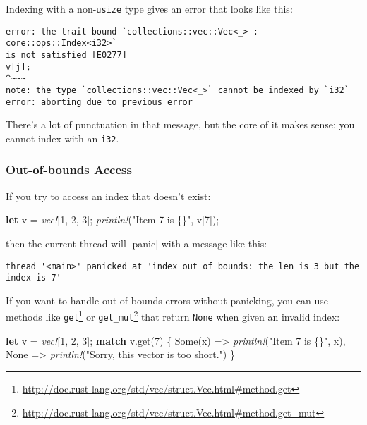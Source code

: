 \documentclass[a4paper,]{book}
\newenvironment{Shaded}{\begin{snugshade}}{\end{snugshade}}
\newcommand{\KeywordTok}[1]{\textcolor[rgb]{0.13,0.29,0.53}{\textbf{{#1}}}}
\newcommand{\DecValTok}[1]{\textcolor[rgb]{0.00,0.00,0.81}{{#1}}}
\newcommand{\ConstantTok}[1]{\textcolor[rgb]{0.00,0.00,0.00}{{#1}}}
\newcommand{\StringTok}[1]{\textcolor[rgb]{0.31,0.60,0.02}{{#1}}}
\newcommand{\PreprocessorTok}[1]{\textcolor[rgb]{0.56,0.35,0.01}{\textit{{#1}}}}
\newcommand{\NormalTok}[1]{{#1}}
\renewcommand{\href}[2]{#2\footnote{\url{#1}}}
\begin{document}
Indexing with a non-\texttt{usize} type gives an error that looks like
this:

\begin{verbatim}
error: the trait bound `collections::vec::Vec<_> : core::ops::Index<i32>`
is not satisfied [E0277]
v[j];
^~~~
note: the type `collections::vec::Vec<_>` cannot be indexed by `i32`
error: aborting due to previous error
\end{verbatim}

There's a lot of punctuation in that message, but the core of it makes
sense: you cannot index with an \texttt{i32}.

\subsubsection{Out-of-bounds Access}\label{out-of-bounds-access}

If you try to access an index that doesn't exist:

\begin{Shaded}
\begin{Highlighting}[]
\KeywordTok{let} \NormalTok{v = }\PreprocessorTok{vec!}\NormalTok{[}\DecValTok{1}\NormalTok{, }\DecValTok{2}\NormalTok{, }\DecValTok{3}\NormalTok{];}
\PreprocessorTok{println!}\NormalTok{(}\StringTok{"Item 7 is \{\}"}\NormalTok{, v[}\DecValTok{7}\NormalTok{]);}
\end{Highlighting}
\end{Shaded}

then the current thread will {[}panic{]} with a message like this:

\begin{verbatim}
thread '<main>' panicked at 'index out of bounds: the len is 3 but the index is 7'
\end{verbatim}

If you want to handle out-of-bounds errors without panicking, you can
use methods like
\href{http://doc.rust-lang.org/std/vec/struct.Vec.html\#method.get}{\texttt{get}}
or
\href{http://doc.rust-lang.org/std/vec/struct.Vec.html\#method.get_mut}{\texttt{get\_mut}}
that return \texttt{None} when given an invalid index:

\begin{Shaded}
\begin{Highlighting}[]
\KeywordTok{let} \NormalTok{v = }\PreprocessorTok{vec!}\NormalTok{[}\DecValTok{1}\NormalTok{, }\DecValTok{2}\NormalTok{, }\DecValTok{3}\NormalTok{];}
\KeywordTok{match} \NormalTok{v.get(}\DecValTok{7}\NormalTok{) \{}
    \ConstantTok{Some}\NormalTok{(x) => }\PreprocessorTok{println!}\NormalTok{(}\StringTok{"Item 7 is \{\}"}\NormalTok{, x),}
    \ConstantTok{None} \NormalTok{=> }\PreprocessorTok{println!}\NormalTok{(}\StringTok{"Sorry, this vector is too short."}\NormalTok{)}
\NormalTok{\}}
\end{Highlighting}
\end{Shaded}
\end{document}
